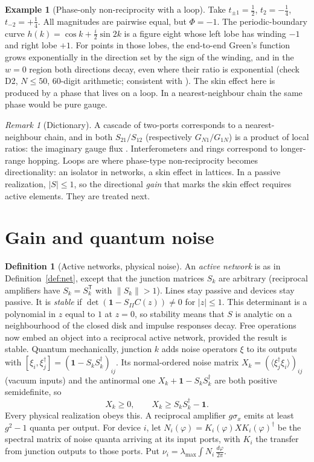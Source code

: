 \documentclass[11pt]{article}
\theoremstyle{definition}
\newtheorem{definition}{Definition}
\newtheorem{example}{Example}
\theoremstyle{remark}
\newtheorem{remark}{Remark}
\newcommand{\one}{\mathbf 1}
\newcommand{\T}{\mathsf T}
\begin{document}
\begin{example}[Phase-only non-reciprocity with a loop]\label{ex:eight}
Take $t_{\pm1}=\frac12$, $t_2=-\frac14$, $t_{-2}=+\frac14$. All magnitudes are pairwise equal, but $\Phi=-1$. The periodic-boundary curve $h(k)=\cos k+\frac i2\sin2k$ is a figure eight whose left lobe has winding $-1$ and right lobe $+1$. For points in those lobes, the end-to-end Green's function grows exponentially in the direction set by the sign of the winding, and in the $w=0$ region both directions decay, even where their ratio is exponential (check D2, $N\le50$, 60-digit arithmetic; consistent with \cite{ZRR21,WBN20}). The skin effect here is produced by a phase that lives on a loop. In a nearest-neighbour chain the same phase would be pure gauge.
\end{example}

\begin{remark}[Dictionary]
A cascade of two-ports corresponds to a nearest-neighbour chain, and in both $S_{21}/S_{12}$ (respectively $G_{N1}/G_{1N}$) is a product of local ratios: the imaginary gauge flux \cite{HN96}. Interferometers and rings correspond to longer-range hopping. Loops are where phase-type non-reciprocity becomes directionality: an isolator in networks, a skin effect in lattices. In a passive realization, $|S|\le1$, so the directional \emph{gain} that marks the skin effect requires active elements. They are treated next.
\end{remark}


\section{Gain and quantum noise}\label{sec:gain}

\begin{definition}[Active networks, physical noise]\label{def:active}
An \emph{active network} is as in Definition~\ref{def:net}, except that the junction matrices $S_k$ are arbitrary (reciprocal amplifiers have $S_k=S_k^\T$ with $\|S_k\|>1$). Lines stay passive and devices stay passive. It is \emph{stable} if $\det(\one-S_{II}C(z))\ne0$ for $|z|\le1$. This determinant is a polynomial in $z$ equal to $1$ at $z=0$, so stability means that $S$ is analytic on a neighbourhood of the closed disk and impulse responses decay. Free operations now embed an object into a reciprocal active network, provided the result is stable. Quantum mechanically, junction $k$ adds noise operators $\xi$ to its outputs with $[\xi_i,\xi_j^\dagger]=(\one-S_kS_k^\dagger)_{ij}$. Its normal-ordered noise matrix $X_k=(\langle\xi_j^\dagger\xi_i\rangle)_{ij}$ (vacuum inputs) and the antinormal one $X_k+\one-S_kS_k^\dagger$ are both positive semidefinite, so
\[
X_k\ge0,\qquad X_k\ge S_kS_k^\dagger-\one .
\]
Every physical realization obeys this. A reciprocal amplifier $g\sigma_x$ emits at least $g^2-1$ quanta per output. For device $i$, let $N_i(\varphi)=K_i(\varphi)XK_i(\varphi)^\dagger$ be the spectral matrix of noise quanta arriving at its input ports, with $K_i$ the transfer from junction outputs to those ports. Put $\nu_i=\lambda_{\max}\int N_i\,\frac{d\varphi}{2\pi}$.
\end{definition}
\end{document}
